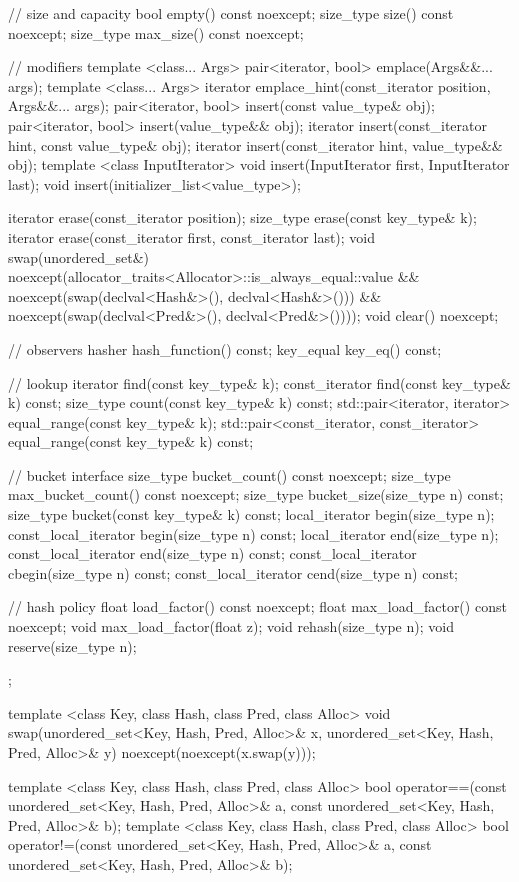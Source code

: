 \begin{codeblock}
{{    // size and capacity
    bool      empty() const noexcept;
    size_type size() const noexcept;
    size_type max_size() const noexcept;

    // modifiers
    template <class... Args> pair<iterator, bool> emplace(Args&&... args);
    template <class... Args> iterator emplace_hint(const_iterator position, Args&&... args);
    pair<iterator, bool> insert(const value_type& obj);
    pair<iterator, bool> insert(value_type&& obj);
    iterator insert(const_iterator hint, const value_type& obj);
    iterator insert(const_iterator hint, value_type&& obj);
    template <class InputIterator> void insert(InputIterator first, InputIterator last);
    void insert(initializer_list<value_type>);

    iterator  erase(const_iterator position);
    size_type erase(const key_type& k);
    iterator  erase(const_iterator first, const_iterator last);
    void      swap(unordered_set&)
      noexcept(allocator_traits<Allocator>::is_always_equal::value &&
               noexcept(swap(declval<Hash&>(), declval<Hash&>())) &&
               noexcept(swap(declval<Pred&>(), declval<Pred&>())));
    void      clear() noexcept;

    // observers
    hasher hash_function() const;
    key_equal key_eq() const;

    // lookup
    iterator       find(const key_type& k);
    const_iterator find(const key_type& k) const;
    size_type      count(const key_type& k) const;
    std::pair<iterator, iterator>             equal_range(const key_type& k);
    std::pair<const_iterator, const_iterator> equal_range(const key_type& k) const;

    // bucket interface
    size_type bucket_count() const noexcept;
    size_type max_bucket_count() const noexcept;
    size_type bucket_size(size_type n) const;
    size_type bucket(const key_type& k) const;
    local_iterator begin(size_type n);
    const_local_iterator begin(size_type n) const;
    local_iterator end(size_type n);
    const_local_iterator end(size_type n) const;
    const_local_iterator cbegin(size_type n) const;
    const_local_iterator cend(size_type n) const;

    // hash policy
    float load_factor() const noexcept;
    float max_load_factor() const noexcept;
    void max_load_factor(float z);
    void rehash(size_type n);
    void reserve(size_type n);
  };

  template <class Key, class Hash, class Pred, class Alloc>
    void swap(unordered_set<Key, Hash, Pred, Alloc>& x,
              unordered_set<Key, Hash, Pred, Alloc>& y)
      noexcept(noexcept(x.swap(y)));

  template <class Key, class Hash, class Pred, class Alloc>
    bool operator==(const unordered_set<Key, Hash, Pred, Alloc>& a,
                    const unordered_set<Key, Hash, Pred, Alloc>& b);
  template <class Key, class Hash, class Pred, class Alloc>
    bool operator!=(const unordered_set<Key, Hash, Pred, Alloc>& a,
                    const unordered_set<Key, Hash, Pred, Alloc>& b);
}
\end{codeblock}

